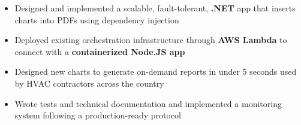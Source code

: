 \begin{itemize}
    \item Designed and implemented a scalable, fault-tolerant, \textbf{.NET} app that inserts charts into PDFs using dependency injection
    \item Deployed existing orchestration infrastructure through \textbf{AWS Lambda} to connect with a \textbf{containerized Node.JS app}
    \item Designed new charts to generate on-demand reports in under 5 seconds used by HVAC contractors across the country
    \item Wrote tests and technical documentation and implemented a monitoring system following a production-ready protocol
\end{itemize}